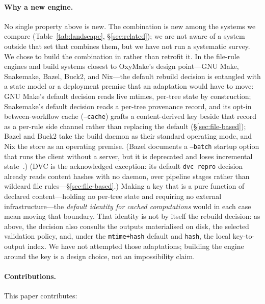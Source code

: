 \documentclass[12pt,a4paper]{article}
\newcommand{\code}[1]{{\texttt{\small\color{inlinecode}#1}}}
\begin{document}
\paragraph{Why a new engine.}
No single property above is new. The combination is new among the
systems we compare (Table~\ref{tab:landscape},
\S\ref{sec:related}); we are not aware of a system outside that set
that combines them, but we have not run a systematic survey. We chose
to build the combination in rather than retrofit it. In the file-rule
engines and build systems closest to OxyMake's design point---GNU
Make, Snakemake, Bazel, Buck2, and Nix---the
default rebuild decision is entangled with a state model or a
deployment premise that an adaptation would have to move: GNU Make's
default decision reads live mtimes, per-tree state by construction;
Snakemake's
default decision reads a per-tree provenance record, and its opt-in
between-workflow cache (\code{--cache}) grafts a content-derived key
beside that record as a per-rule side channel rather than replacing
the default (\S\ref{sec:file-based}); Bazel and Buck2 take the build daemon as
their standard operating mode, and Nix the store as an operating
premise.  (Bazel documents a \code{--batch} startup option that runs
the client without a server, but it is deprecated and loses incremental
state~\cite{bazelCommandLine}.) (DVC is the acknowledged
exception: its default \code{dvc repro} decision already reads content
hashes with no daemon, over pipeline stages rather than wildcard file
rules---\S\ref{sec:file-based}.) Making a key that is a pure function
of declared content---holding no per-tree state and requiring no
external infrastructure---the \emph{default identity for cached
computations} would in each case mean moving that boundary. That
identity is not by itself the rebuild decision: as above, the decision
also consults the outputs materialised on disk, the selected validation
policy, and, under the \code{mtime+hash} default and \code{hash}, the
local key-to-output index. We have not attempted
those adaptations; building the engine around the key is a design
choice, not an impossibility claim.

\paragraph{Contributions.}
This paper contributes:
\end{document}

